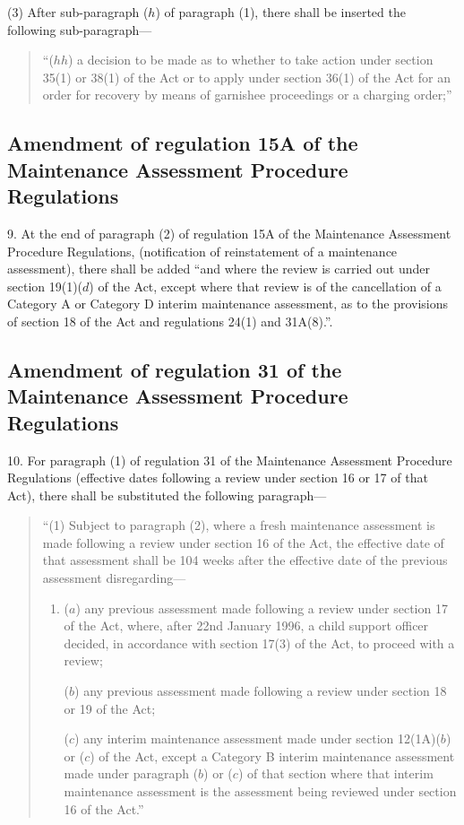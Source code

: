 \documentclass[a4paper]{article}
\begin{document}
(3) After sub-paragraph ($h$) of paragraph (1), there shall be inserted the following sub-paragraph—
\begin{quotation}
“($hh$) a decision to be made as to whether to take action under section 35(1) or 38(1) of the Act or to apply under section 36(1) of the Act for an order for recovery by means of garnishee proceedings or a charging order;”
\end{quotation}

\subsection[9. Amendment of regulation 15A of the Maintenance Assessment Procedure Regulations]{Amendment of regulation 15A of the Maintenance Assessment Procedure Regulations}

9.  At the end of paragraph (2) of regulation 15A of the Maintenance Assessment Procedure Regulations, (notification of reinstatement of a maintenance assessment), there shall be added “and where the review is carried out under section 19(1)($d$) of the Act, except where that review is of the cancellation of a Category A or Category D interim maintenance assessment, as to the provisions of section 18 of the Act and regulations 24(1) and 31A(8).”.

\subsection[10. Amendment of regulation 31 of the Maintenance Assessment Procedure Regulations]{Amendment of regulation 31 of the Maintenance Assessment Procedure Regulations}

10.  For paragraph (1) of regulation 31 of the Maintenance Assessment Procedure Regulations (effective dates following a review under section 16 or 17 of that Act), there shall be substituted the following paragraph—
\begin{quotation}
“(1) Subject to paragraph (2), where a fresh maintenance assessment is made following a review under section 16 of the Act, the effective date of that assessment shall be 104 weeks after the effective date of the previous assessment disregarding—
\begin{enumerate}\item[]
($a$) any previous assessment made following a review under section 17 of the Act, where, after 22nd January 1996, a child support officer decided, in accordance with section 17(3) of the Act, to proceed with a review;

($b$) any previous assessment made following a review under section 18 or 19 of the Act;

($c$) any interim maintenance assessment made under section 12(1A)($b$) or ($c$) of the Act, except a Category B interim maintenance assessment made under paragraph ($b$) or ($c$) of that section where that interim maintenance assessment is the assessment being reviewed under section 16 of the Act.”
\end{enumerate}
\end{quotation}
\end{document}
